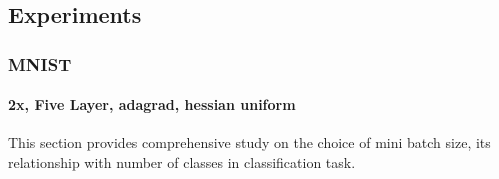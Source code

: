\subsection{Experiments}

\subsubsection{MNIST}
\paragraph{2x, Five Layer, adagrad, hessian uniform}
%
\noindent This section provides comprehensive study on the choice of mini batch size, its relationship with number of classes in classification task.
\dnwtwoptinit
{}\dnwfooptinit
{}\dnwsxoptinit
{}\dnwegoptinit
{}\dnwhnoptinit
{}\dnwhntwoptinit
{}\dnwhnfooptinit
{}\dnwhnsxoptinit
{}\dnwhnegoptinit

\providecommand{\initerr}{Error for initial epochs}
\providecommand{\initacc}{Accuracy for initial epcohs}
\providecommand{\lateerr}{Error for later epochs}
\providecommand{\lateacc}{Accuracy for later epochs}
\providecommand{\boxerr}{Error variation}
\providecommand{\boxacc}{Accuracy variation}

\providecommand{\initfigtitle}{Different batch results for starting 15 epochs }
\providecommand{\initcaption}{The initial epochs seen shows that 2x batch size(2x batch size=2*number of classes) started with the lowest error(a) as well as best accuracy(b), surprisingly 8x batch size started quite well inspite of less network updates in an epoch.
	Then till 15 epochs it is mixed results and no batch size cannot be singled out as a best performer.}

